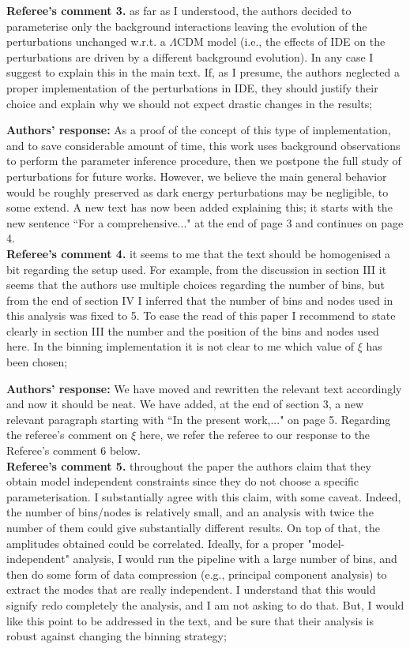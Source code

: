 \documentclass[10pt,fleqn]{report}
\begin{document}
\noindent\textbf{Referee's comment 3.} as far as I understood, the authors decided to parameterise only the
background interactions leaving the evolution of the perturbations unchanged
w.r.t. a $\Lambda$CDM model (i.e., the effects of IDE on the perturbations
are driven by a different background evolution). In any case I suggest to explain this in the main text. If, as I presume, the authors
neglected a proper implementation of the perturbations in IDE,
they should justify their choice and explain why we should not expect
drastic changes in the results;

\noindent\textbf{Authors'  response:}  As a proof of the concept of this type of implementation, and to save considerable amount of time, this work uses background observations to perform the parameter inference procedure, then we postpone the full study of perturbations for future works. However, we believe the main general behavior would be roughly preserved as dark energy perturbations may be negligible, to some extend.
A new text has now been added explaining this; it starts with the new sentence ``For a comprehensive..." at the end of page 3 and continues on page 4.
\\

\noindent\textbf{Referee's comment 4.} it seems to me that the text should be homogenised a bit regarding
the setup used. For example, from the discussion in section III it seems
that the authors use multiple choices regarding the number of bins, but
from the end of section IV I inferred that the number of bins and nodes
used in this analysis was fixed to 5. To ease the read of this paper I
recommend to state clearly in section III the number and the position
of the bins and nodes used here. In the binning implementation it is
not clear to me which value of $\xi$ has been chosen;

\noindent\textbf{Authors'  response:} We have moved and rewritten the relevant text accordingly and now it should be neat. We have added, at the end of section 3, a new relevant paragraph starting with ``In the present work,..." on page 5. Regarding the referee's comment on $\xi$ here, we refer the referee to our response to the Referee's comment 6 below.
\\

\noindent\textbf{Referee's comment 5.} throughout the paper the authors claim that they obtain model independent
constraints since they do not choose a specific parameterisation.
I substantially agree with this claim, with some caveat. Indeed,
the number of bins/nodes is relatively small, and an analysis with twice
the number of them could give substantially different results. On top
of that, the amplitudes obtained could be correlated. Ideally, for a
proper "model-independent" analysis, I would run the pipeline with a
large number of bins, and then do some form of data compression (e.g.,
principal component analysis) to extract the modes that are really independent.
I understand that this would signify redo completely the
analysis, and I am not asking to do that. But, I would like this point
to be addressed in the text, and be sure that their analysis is robust
against changing the binning strategy;
\end{document}
